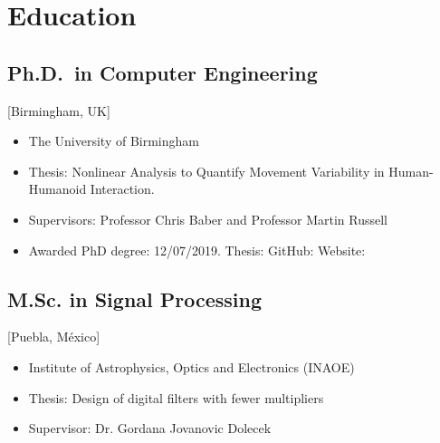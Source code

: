 \documentclass{mycv}
\begin{document}
\maketitle


\footnotesize

\section{Education}
\subsection{Ph.D.\ in Computer Engineering}[Birmingham, UK]
\begin{itemize}[label={}]
  \item The University of Birmingham 
  \item Thesis: Nonlinear Analysis to Quantify Movement Variability in Human-Humanoid Interaction.   
  \item Supervisors: Professor Chris Baber and  Professor Martin Russell
  \item	Awarded PhD degree: 12/07/2019. Thesis: \href{https://doi.org/10.5281/zenodo.3384145}{\faFilePdfO}
	GitHub: \href{http://doi.org/10.5281/zenodo.3384281}{\faGithubAlt}
	Website: \href{https://mxochicale-phd.github.io/site/}{\faExternalLink} 
\end{itemize}

\subsection{M.Sc. in Signal Processing}[Puebla, M\'exico]
\begin{itemize}[label={}]
  \item Institute of Astrophysics, Optics and Electronics (INAOE) 
  \item Thesis: Design of digital filters with fewer multipliers 
  	\href{https://github.com/mxochicale/publications/blob/master/thesis/M.Sc./doc/MPXochicale_MScThesis-2016.pdf}{\faFilePdfO}
	\href{https://github.com/mxochicale/publications/tree/master/thesis/M.Sc.}{\faGithubAlt}
  \item Supervisor: Dr. Gordana Jovanovic Dolecek
\end{itemize}
\end{document}
